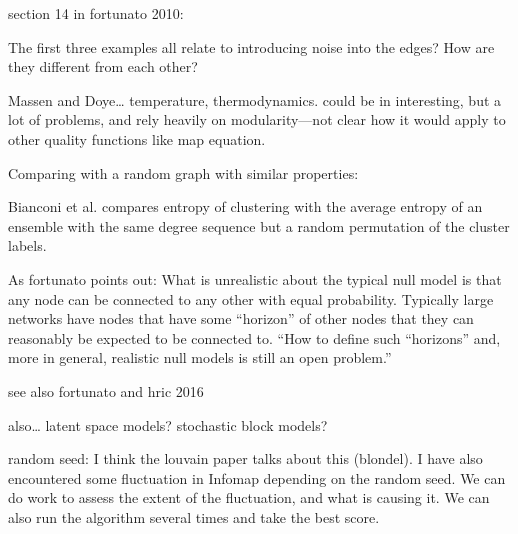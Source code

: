 section 14 in fortunato 2010:

The first three examples all relate to introducing noise into the edges?
How are they different from each other?

Massen and Doye\ldots{} temperature, thermodynamics. could be in
interesting, but a lot of problems, and rely heavily on modularity---not
clear how it would apply to other quality functions like map equation.

Comparing with a random graph with similar properties:

Bianconi et al. compares entropy of clustering with the average entropy
of an ensemble with the same degree sequence but a random permutation of
the cluster labels.

As fortunato points out: What is unrealistic about the typical null
model is that any node can be connected to any other with equal
probability. Typically large networks have nodes that have some
``horizon'' of other nodes that they can reasonably be expected to be
connected to. ``How to define such ``horizons'' and, more in general,
realistic null models is still an open problem.''

see also fortunato and hric 2016

also\ldots{} latent space models? stochastic block models?

random seed: I think the louvain paper talks about this (blondel). I
have also encountered some fluctuation in Infomap depending on the
random seed. We can do work to assess the extent of the fluctuation, and
what is causing it. We can also run the algorithm several times and take
the best score.
